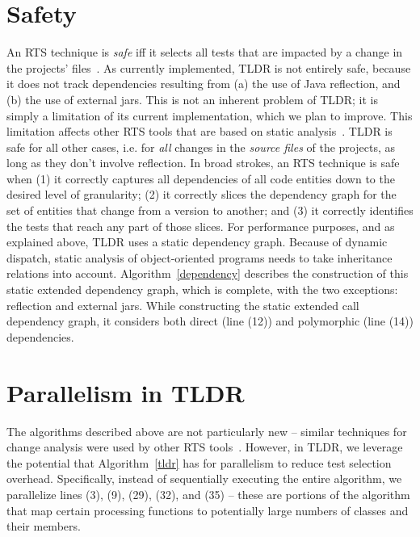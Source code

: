 \section{Safety}
An RTS technique is {\em safe} iff it selects all tests that are impacted by a change in the projects' files~\cite{willmor2005safe}. As currently implemented, TLDR is not entirely safe, because it does not track dependencies resulting from (a) the use of Java reflection, and (b) the use of external jars. This is not an inherent problem of TLDR; it is simply a limitation of its current implementation, which we plan to improve. This limitation affects other RTS tools that are based on static analysis~\cite{starts, hyrts, rtsplusplus}. TLDR is safe for all other cases, i.e. for {\em all} changes in the {\em source files} of the projects, as long as they don't involve reflection. 
In broad strokes, an RTS technique is safe when (1) it correctly captures all dependencies of all code entities down to the desired level of granularity; (2) it correctly slices the dependency graph for the set of entities that change from a version to another; and (3) it correctly identifies the tests that reach any part of those slices. For performance purposes, and as explained above, TLDR uses a static dependency graph. Because of dynamic dispatch, static analysis of object-oriented programs needs to take inheritance relations into account. Algorithm~\ref{dependency} describes the construction of this static extended dependency graph, which is complete, with the two exceptions: reflection and external jars. While constructing the static extended call dependency graph, it considers both direct (line (12)) and polymorphic (line (14)) dependencies.  

\section{Parallelism in TLDR}

The algorithms described above are not particularly new -- similar techniques for change analysis were used by other RTS tools~\cite{faulttracer, hyrts, ekstazi, starts}. However, in TLDR, we leverage the potential that Algorithm~\ref{tldr} has for parallelism to reduce test selection overhead. Specifically, instead of sequentially executing the entire algorithm, we parallelize lines (3), (9), (29), (32), and (35) -- these are portions of the algorithm that map certain processing functions to potentially large numbers of classes and their members.

